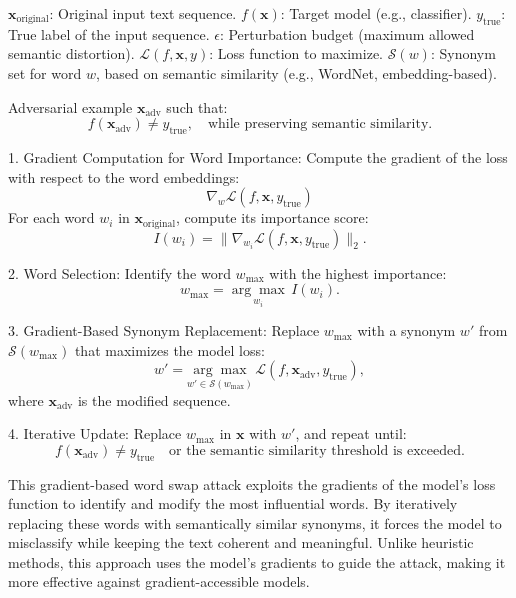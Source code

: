 
$\mathbf{x}_{\text{original}}$: Original input text sequence.  
$f(\mathbf{x})$: Target model (e.g., classifier).  
$y_{\text{true}}$: True label of the input sequence.  
$\epsilon$: Perturbation budget (maximum allowed semantic distortion).  
$\mathcal{L}(f, \mathbf{x}, y)$: Loss function to maximize.  
$\mathcal{S}(w)$: Synonym set for word $w$, based on semantic similarity (e.g., WordNet, embedding-based).

Adversarial example $\mathbf{x}_{\text{adv}}$ such that:
\[
f(\mathbf{x}_{\text{adv}}) \neq y_{\text{true}}, \quad \text{while preserving semantic similarity.}
\]

1. Gradient Computation for Word Importance:
   Compute the gradient of the loss with respect to the word embeddings:
   \[
   \nabla_w \mathcal{L}(f, \mathbf{x}, y_{\text{true}})
   \]
   For each word $w_i$ in $\mathbf{x}_{\text{original}}$, compute its importance score:
   \[
   I(w_i) = \|\nabla_{w_i} \mathcal{L}(f, \mathbf{x}, y_{\text{true}})\|_2.
   \]

2. Word Selection:
   Identify the word $w_{\text{max}}$ with the highest importance:
   \[
   w_{\text{max}} = \underset{w_i}{\arg \max} \, I(w_i).
   \]

3. Gradient-Based Synonym Replacement:
   Replace $w_{\text{max}}$ with a synonym $w'$ from $\mathcal{S}(w_{\text{max}})$ that maximizes the model loss:
   \[
   w' = \underset{w' \in \mathcal{S}(w_{\text{max}})}{\arg \max} \, \mathcal{L}(f, \mathbf{x}_{\text{adv}}, y_{\text{true}}),
   \]
   where $\mathbf{x}_{\text{adv}}$ is the modified sequence.

4. Iterative Update:
   Replace $w_{\text{max}}$ in $\mathbf{x}$ with $w'$, and repeat until:
   \[
   f(\mathbf{x}_{\text{adv}}) \neq y_{\text{true}} \quad \text{or the semantic similarity threshold is exceeded.}
   \]

This gradient-based word swap attack exploits the gradients of the model's loss function to identify and modify the most influential words. By iteratively replacing these words with semantically similar synonyms, it forces the model to misclassify while keeping the text coherent and meaningful. Unlike heuristic methods, this approach uses the model's gradients to guide the attack, making it more effective against gradient-accessible models.